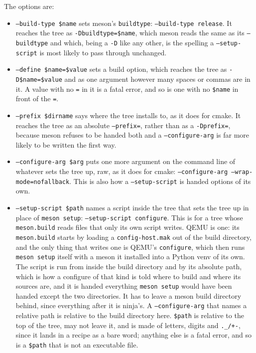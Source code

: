 \documentclass{article}
\begin{document}
The options are:

\begin{itemize}
\item \texttt{--build-type \$name} sets meson's \texttt{buildtype}:
  \texttt{--build-type release}.  It reaches the tree as
  \texttt{-Dbuildtype=\$name}, which meson reads the same as its
  \texttt{--buildtype} and which, being a \texttt{-D} like any other,
  is the spelling a \texttt{--setup-script} is most likely to pass
  through unchanged.

\item \texttt{--define \$name=\$value} sets a build option, which
  reaches the tree as \texttt{-D\$name=\$value} and as one argument
  however many spaces or commas are in it.  A value with no
  \texttt{=} in it is a fatal error, and so is one with no
  \texttt{\$name} in front of the \texttt{=}.

\item \texttt{--prefix \$dirname} says where the tree installs to, as
  it does for cmake.  It reaches the tree as an absolute
  \texttt{--prefix=}, rather than as a \texttt{-Dprefix=}, because
  meson refuses to be handed both and a \texttt{--configure-arg} is
  far more likely to be written the first way.

\item \texttt{--configure-arg \$arg} puts one more argument on the
  command line of whatever sets the tree up, raw, as it does for
  cmake: \texttt{--configure-arg --wrap-mode=nofallback}.  This is
  also how a \texttt{--setup-script} is handed options of its own.

\item \texttt{--setup-script \$path} names a script inside the tree
  that sets the tree up in place of \texttt{meson setup}:
  \texttt{--setup-script configure}.  This is for a tree whose
  \texttt{meson.build} reads files that only its own script writes.
  QEMU is one: its \texttt{meson.build} starts by loading a
  \texttt{config-host.mak} out of the build directory, and the only
  thing that writes one is QEMU's \texttt{configure}, which then runs
  \texttt{meson setup} itself with a meson it installed into a Python
  venv of its own.  The script is run from inside the build directory
  and by its absolute path, which is how a configure of that kind is
  told where to build and where its sources are, and it is handed
  everything \texttt{meson setup} would have been handed except the
  two directories.  It has to leave a meson build directory behind,
  since everything after it is ninja's.  A \texttt{--configure-arg}
  that names a relative path is relative to the build directory here.
  \texttt{\$path} is relative to the top of the tree, may not leave
  it, and is made of letters, digits and \texttt{.\_/+-}, since it
  lands in a recipe as a bare word; anything else is a fatal error,
  and so is a \texttt{\$path} that is not an executable file.


\end{itemize}
\end{document}
